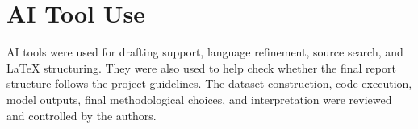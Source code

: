 \section*{AI Tool Use}
AI tools were used for drafting support, language refinement, source search, and LaTeX structuring. They were also used to help check whether the final report structure follows the project guidelines. The dataset construction, code execution, model outputs, final methodological choices, and interpretation were reviewed and controlled by the authors.
